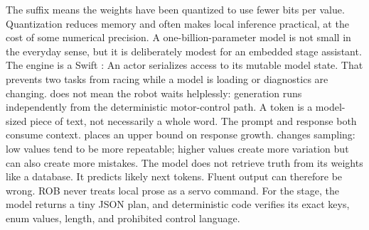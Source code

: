 {}The suffix  means the weights have been quantized to use fewer bits per\markdownRendererSoftLineBreak
{}value. Quantization reduces memory and often makes local inference practical,\markdownRendererSoftLineBreak
{}at the cost of some numerical precision. A one-billion-parameter model is not\markdownRendererSoftLineBreak
{}small in the everyday sense, but it is deliberately modest for an embedded\markdownRendererSoftLineBreak
{}stage assistant.\markdownRendererParagraphSeparator
{}The engine is a Swift :\markdownRendererInterblockSeparator
{}\markdownRendererInterblockSeparator
{}An actor serializes access to its mutable model state. That prevents two tasks\markdownRendererSoftLineBreak
{}from racing while a model is loading or diagnostics are changing. \markdownRendererSoftLineBreak
{}does not mean the robot waits helplessly: generation runs independently from\markdownRendererSoftLineBreak
{}the deterministic motor-control path.\markdownRendererInterblockSeparator
{}
\markdownRendererSectionEnd \markdownRendererSectionBegin
{}\markdownRendererInterblockSeparator
{}A token is a model-sized piece of text, not necessarily a whole word. The\markdownRendererSoftLineBreak
{}prompt and response both consume context.  places an upper bound on\markdownRendererSoftLineBreak
{}response growth.  changes sampling: low values tend to be more\markdownRendererSoftLineBreak
{}repeatable; higher values create more variation but can also create more\markdownRendererSoftLineBreak
{}mistakes.\markdownRendererParagraphSeparator
{}The model does not retrieve truth from its weights like a database. It predicts\markdownRendererSoftLineBreak
{}likely next tokens. Fluent output can therefore be wrong. ROB never treats\markdownRendererSoftLineBreak
{}local prose as a servo command. For the stage, the model returns a tiny JSON\markdownRendererSoftLineBreak
{}plan, and deterministic code verifies its exact keys, enum values, length, and\markdownRendererSoftLineBreak
{}prohibited control language.\markdownRendererInterblockSeparator
{}
\markdownRendererSectionEnd \markdownRendererSectionBegin
{}\markdownRendererInterblockSeparator
